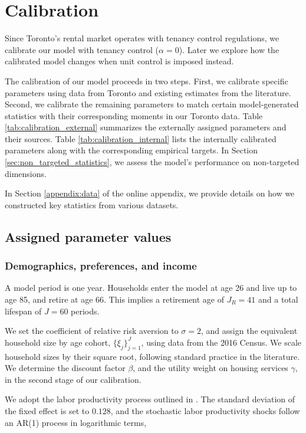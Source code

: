 \documentclass[parskip=full]{article}
\begin{document}
\section{Calibration}\label{sec:calibration}

Since Toronto's rental market operates with tenancy control regulations, we calibrate our model with tenancy control ($\alpha=0$). Later we explore how the calibrated model changes when unit control is imposed instead.

The calibration of our model proceeds in two steps. First, we calibrate specific parameters using data from Toronto and existing estimates from the literature. Second, we calibrate the remaining parameters to match certain model-generated statistics with their corresponding moments in our Toronto data. Table \ref{tab:calibration_external} summarizes the externally assigned parameters and their sources. Table \ref{tab:calibration_internal} lists the internally calibrated parameters along with the corresponding empirical targets. In Section \ref{sec:non_targeted_statistics}, we assess the model's performance on non-targeted dimensions.

In Section \ref{appendix:data} of the online appendix, we provide details on how we constructed key statistics from various datasets. 

\subsection{Assigned parameter values}

\subsubsection{Demographics, preferences, and income}
A model period is one year. Households enter the model at age 26 and live up to age 85, and retire at age 66. This implies a retirement age of $J_{R}=41$ and a total lifespan of $J=60$ periods. 

We set the coefficient of relative risk aversion to $\sigma=2$, and assign the equivalent household size by age cohort, $\{\xi_{j}\}_{j=1}^{J}$, using data from the 2016 Census. We scale household sizes by their square root, following standard practice in the literature. We determine the discount factor $\beta$, and the utility weight on housing services $\gamma$, in the second stage of our calibration.

We adopt the labor productivity process outlined in \citet{gkkoc}. The standard deviation of the fixed effect is set to $0.128$, and the stochastic labor productivity shocks follow an AR(1) process in logarithmic terms,
\end{document}
